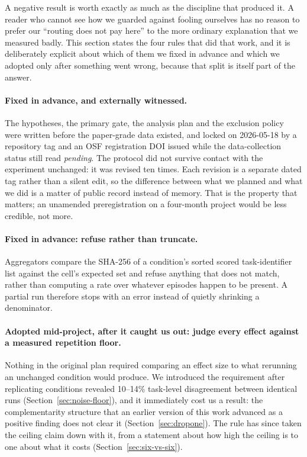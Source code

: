 A negative result is worth exactly as much as the discipline that produced it. A
reader who cannot see how we guarded against fooling ourselves has no reason to
prefer our ``routing does not pay here'' to the more ordinary explanation that
we measured badly. This section states the four rules that did that work, and it
is deliberately explicit about which of them we fixed in advance and which we adopted only after something went wrong, because that split is itself part of the answer.

\paragraph{Fixed in advance, and externally witnessed.} The hypotheses, the
primary gate, the analysis plan and the exclusion policy were written before the
paper-grade data existed, and locked on 2026-05-18 by a repository tag and an
OSF registration DOI issued while the data-collection status still read
\emph{pending}. The protocol did not survive contact with the experiment unchanged: it was revised ten times. Each revision is a separate dated tag rather than a silent edit, so the difference between what we planned and
what we did is a matter of public record instead of memory. That is the property
that matters; an unamended preregistration on a four-month project would be less
credible, not more.

\paragraph{Fixed in advance: refuse rather than truncate.} Aggregators compare
the SHA-256 of a condition's sorted scored task-identifier list against the
cell's expected set and refuse anything that does not match, rather than
computing a rate over whatever episodes happen to be present. A partial run therefore stops with an error instead of quietly shrinking a denominator.

\paragraph{Adopted mid-project, after it caught us out: judge every effect
against a measured repetition floor.} Nothing in the original plan required
comparing an effect size to what rerunning an unchanged condition would produce.
We introduced the requirement after replicating conditions revealed 10--14\%
task-level disagreement between identical runs (Section~\ref{sec:noise-floor}),
and it immediately cost us a result: the complementarity structure that an
earlier version of this work advanced as a positive finding does not clear it
(Section~\ref{sec:dropone}). The rule has since taken the ceiling claim down
with it, from a statement about how high the ceiling is to one about what it
costs (Section~\ref{sec:six-vs-six}).

